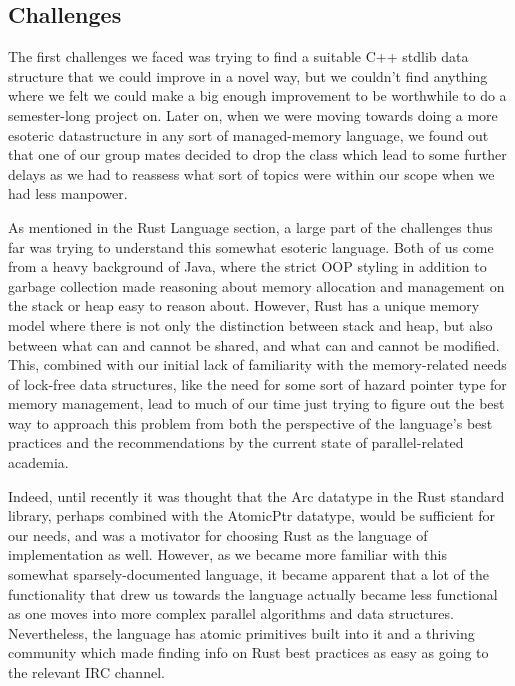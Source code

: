 \documentclass[conference]{IEEEtran}
\begin{document}
\subsection{Challenges}
The first challenges we faced was trying to find a suitable C++ stdlib data structure that we could improve in a novel way, but we couldn't find anything where we felt we could make a big enough improvement to be worthwhile to do a semester-long project on. Later on, when we were moving towards doing a more esoteric datastructure in any sort of managed-memory language, we found out that one of our group mates decided to drop the class which lead to some further delays as we had to reassess what sort of topics were within our scope when we had less manpower.
\par
As mentioned in the Rust Language section, a large part of the challenges thus far was trying to understand this somewhat esoteric language. Both of us come from a heavy background of Java, where the strict OOP styling in addition to garbage collection made reasoning about memory allocation and management on the stack or heap easy to reason about. However, Rust has a unique memory model where there is not only the distinction between stack and heap, but also between what can and cannot be shared, and what can and cannot be modified. This, combined with our initial lack of familiarity with the memory-related needs of lock-free data structures, like the need for some sort of hazard pointer type for memory management, lead to much of our time just trying to figure out the best way to approach this problem from both the perspective of the language's best practices and the recommendations by the current state of parallel-related academia.
\par
Indeed, until recently it was thought that the Arc datatype in the Rust standard library, perhaps combined with the AtomicPtr datatype, would be sufficient for our needs, and was a motivator for choosing Rust as the language of implementation as well. However, as we became more familiar with this somewhat sparsely-documented language, it became apparent that a lot of the functionality that drew us towards the language actually became less functional as one moves into more complex parallel algorithms and data structures. Nevertheless, the language has atomic primitives built into it and a thriving community which made finding info on Rust best practices as easy as going to the relevant IRC channel.
\par
\end{document}
